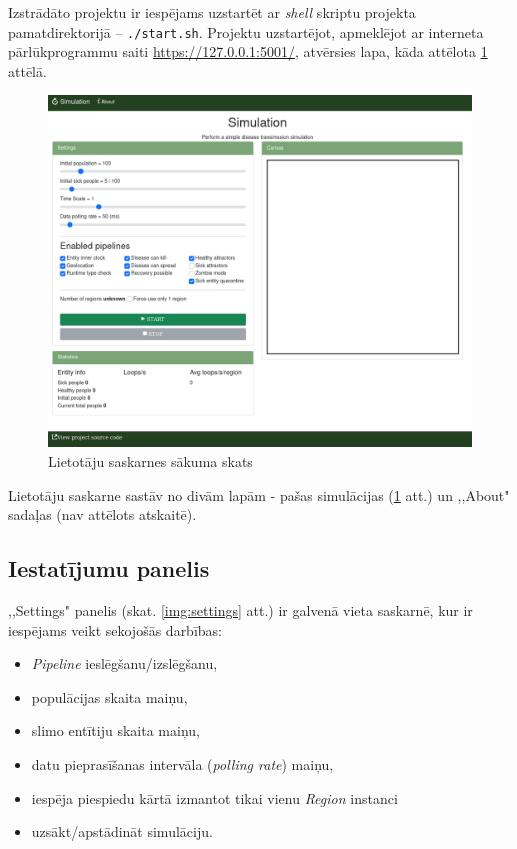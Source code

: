 

Izstrādāto projektu ir iespējams uzstartēt ar \emph{shell} skriptu projekta
pamatdirektorijā -- \texttt{./start.sh}.
Projektu uzstartējot, apmeklējot ar interneta pārlūkprogrammu saiti
\url{https://127.0.0.1:5001/}, atvērsies lapa, kāda attēlota \ref{img:whole-ui} attēlā.

\begin{figure}[H]
	\centering
	\includegraphics[scale=0.4]{images/ui-whole-page.png}
	\caption{Lietotāju saskarnes sākuma skats}
	\label{img:whole-ui}
\end{figure}

Lietotāju saskarne sastāv no divām lapām - pašas simulācijas (\ref{img:whole-ui}
att.) un ,,About" sadaļas (nav attēlots atskaitē).

\subsection{Iestatījumu panelis}

,,Settings" panelis (skat. \ref{img:settings} att.) ir galvenā vieta saskarnē,
kur ir iespējams veikt sekojošās darbības:

\begin{itemize}
    \item \emph{Pipeline} ieslēgšanu/izslēgšanu,
    \item populācijas skaita maiņu,
    \item slimo entītiju skaita maiņu,
    \item datu pieprasīšanas intervāla (\emph{polling rate}) maiņu,
    \item iespēja piespiedu kārtā izmantot tikai vienu \emph{Region} instanci
    \item uzsākt/apstādināt simulāciju.
\end{itemize}


